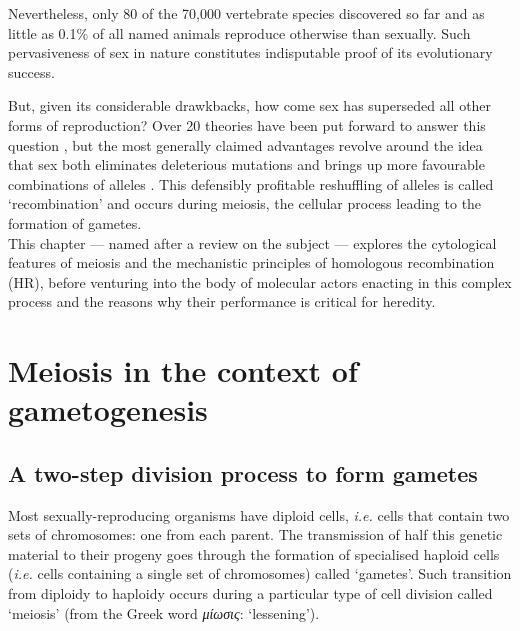 Nevertheless, only 80 \citep{vrijenhoek1989list,neaves2011unisexual} of the 70,000 vertebrate species discovered so far \citep{iucn2019} and as little as 0.1\% of all named animals \citep{vrijenhoek1998animal} reproduce otherwise than sexually. 
Such pervasiveness of sex in nature constitutes indisputable proof of its evolutionary success. 

But, given its considerable drawkbacks, how come sex has superseded all other forms of reproduction?
Over 20 theories have been put forward to answer this question \citep{kondrashov1993classification}, but the most generally claimed advantages revolve around the idea that sex both eliminates deleterious mutations and brings up more favourable combinations of alleles \citep{normarck2003genomic, speijer2016can}.
This defensibly profitable reshuffling of alleles is called ‘recombination’ and occurs during meiosis, the cellular process leading to the formation of gametes.\\

This chapter — named after a review on the subject \citep{hunter2015meiotic} — explores the cytological features of meiosis and the mechanistic principles of homologous recombination (HR), before venturing into the body of molecular actors enacting in this complex process and the reasons why their performance is critical for heredity.










\section{Meiosis in the context of gametogenesis}

\subsection{A two-step division process to form gametes}

Most sexually-reproducing organisms have diploid cells, \textit{i.e.} cells that contain two sets of chromosomes: one from each parent.
The transmission of half this genetic material to their progeny goes through the formation of specialised haploid cells (\textit{i.e.} cells containing a single set of chromosomes) called ‘gametes’.
Such transition from diploidy to haploidy occurs during a particular type of cell division called ‘meiosis’ (from the Greek word \textit{\textgreek{μ}\textepsilon\textgreek{ίωσις}}: ‘lessening’).

